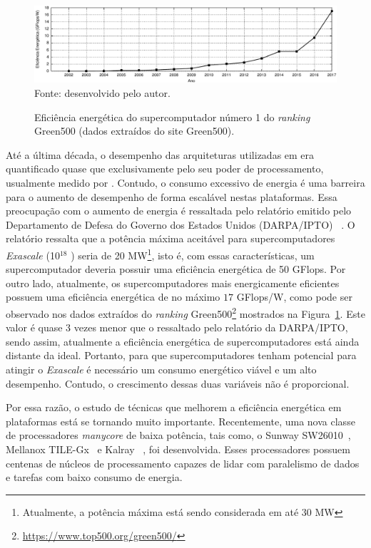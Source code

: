
\begin{figure}[t]
	\centering
	\caption{Eficiência energética do supercomputador número 1 do
        \textit{ranking} Green500 (dados extraídos do site Green500).}
    \includegraphics[width=\textwidth]{figs/green500.pdf} \\
    Fonte: desenvolvido pelo autor.
	\label{fig:graphEnergy}
\end{figure}


Até a última década, o desempenho das arquiteturas utilizadas em \hpc era quantificado quase
que exclusivamente pelo seu poder de processamento, usualmente medido por
\flops. Contudo, o consumo excessivo de energia é uma barreira para o aumento de
desempenho de forma escalável nestas plataformas.
Essa preocupação com o aumento de energia é ressaltada pelo relatório emitido
pelo Departamento de Defesa do Governo dos Estados Unidos (DARPA/IPTO)
~\cite{Kogge2008}. O relatório ressalta que a potência máxima aceitável para supercomputadores
\textit{Exascale} (10$^{18}$ \flops) seria de 20 MW\footnote{Atualmente, a
    potência máxima está sendo considerada em até 30 MW}, isto é, com
essas características, um supercomputador deveria possuir uma eficiência
energética de 50 GFlops.
Por outro lado, atualmente, os supercomputadores mais energicamente eficientes
possuem uma eficiência energética de no máximo $17$ GFlops/W, como pode ser observado nos dados extraídos do \textit{ranking}
Green500\footnote{\url{https://www.top500.org/green500/}} mostrados na Figura~\ref{fig:graphEnergy}.
Este valor é quase 3 vezes menor que o ressaltado pelo
relatório da DARPA/IPTO, sendo assim, atualmente a eficiência energética de
supercomputadores está ainda distante da ideal. Portanto, para que
supercomputadores tenham potencial para atingir o \textit{Exascale} é necessário
um consumo energético viável e um alto desempenho. Contudo, o crescimento dessas
duas variáveis não é proporcional.


Por essa razão, o estudo de técnicas que melhorem a eficiência energética em
plataformas \hpc está se tornando muito importante.  Recentemente, uma nova
classe de processadores \textit{manycore} de baixa potência, tais como, o Sunway
SW26010~\cite{sunway:2016}, Mellanox TILE-Gx~\cite{Valero:2012} e Kalray
\mppa~\cite{Castro-IA3:2013}, foi desenvolvida. Esses processadores possuem
centenas de núcleos de processamento capazes de lidar com paralelismo de dados e
tarefas com baixo consumo de energia.

